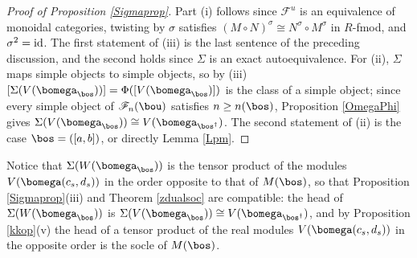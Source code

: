 \documentclass[11pt,reqno]{amsart}
\theoremstyle{definition} \newtheorem*{defn}{Definition}
\theoremstyle{definition}
\numberwithin{equation}{section}
\begin{document}
\begin{proof}[Proof of Proposition \ref{Sigmaprop}] Part (i) follows since $\mathcal F^u$ is an equivalence of monoidal
categories, twisting by $\sigma$ satisfies $(M\circ N)^\sigma\cong N^\sigma\circ M^\sigma$ in $R$-fmod, and $\sigma^2={\rm id}$. The
first statement of (iii) is the last sentence of the preceding discussion, and the second holds since $\Sigma$ is
an exact autoequivalence. For (ii), $\Sigma$ maps simple objects to simple objects, so by (iii)
$[\Sigma(V(\bomega_\bos))]=\Phi([V(\bomega_\bos)])$ is the class of a simple object; since every simple object of
$\mathscr F_n(\bou)$ satisfies $n\ge n(\bos)$, Proposition \ref{OmegaPhi} gives $\Sigma(V(\bomega_\bos))\cong V(\bomega_{\bos^\dagger})$.
The second statement of (ii) is the case $\bos=([a,b])$, or directly Lemma \ref{Lpm}.
\end{proof}
\noindent Notice that $\Sigma(W(\bomega_\bos))$ is the tensor product of the modules $V(\bomega(c_s,d_s))$ in
the order opposite to that of $M(\bos)$, so that Proposition \ref{Sigmaprop}(iii) and Theorem
\ref{zdualsoc} are compatible: the head of $\Sigma(W(\bomega_\bos))$ is $\Sigma(V(\bomega_\bos))\cong
V(\bomega_{\bos^\dagger})$, and by Proposition \ref{kkop}(v) the head of a tensor product of the real modules
$V(\bomega(c_s,d_s))$ in the opposite order is the socle of $M(\bos)$.
\end{document}
